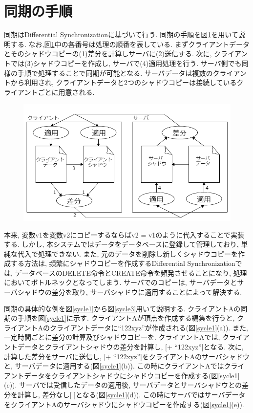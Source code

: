 \section{同期の手順}
同期はDifferential Synchronizationに基づいて行う.
同期の手順を図\ref{differential}を用いて説明する. なお,図\ref{differential}中の各番号は処理の順番を表している. まずクライアントデータとそのシャドウコピーの(1)差分を計算しサーバに(2)送信する. 次に, クライアントでは(3)シャドウコピーを作成し, サーバで(4)適用処理を行う. サーバ側でも同様の手順で処理することで同期が可能となる. サーバデータは複数のクライアントから利用され, クライアントデータと2つのシャドウコピーは接続しているクライアントごとに用意される.
\begin{figure}[]
  \begin{center}
    \includegraphics[scale=0.7]{images/DS}
    \caption{}
    \label{differential}
  \end{center}
\end{figure}
\par
本来, 変数v1を変数v2にコピーするならばv2 = v1のように代入することで実装する. しかし, 本システムではデータをデータベースに登録して管理しており, 単純な代入で処理できない.
また, 元のデータを削除し新しくシャドウコピーを作成する方法は, 頻繁にシャドウコピーを作成するDifferential Synchronizationでは,
データベースのDELETE命令とCREATE命令を頻発させることになり, 処理においてボトルネックとなってしまう. サーバでのコピーは, サーバデータとサーバシャドウの差分を取り, サーバシャドウに適用することによって解決する.
\par
同期の具体的な例を図\ref{sycle1}から図\ref{sycle3}用いて説明する. クライアントAの同期の手順を図\ref{sycle1}に示す.
クライアントAが頂点を作成する編集を行うと, クライアントAのクライアントデータに``122xyz''が作成される(図\ref{sycle1}(a)).
また, 一定時間ごとに差分の計算及びシャドウコピーを. クライアントAでは, クライアントデータとクライアントシャドウの差分を計算し, [+ ``122xyz'']となる. 次に, 計算した差分をサーバに送信し, [+ ``122xyz'']をクライアントAのサーバシャドウと, サーバデータに適用する(図\ref{sycle1}(b)). この時にクライアントAではクライアントデータをクライアントシャドウにシャドウコピーを作成する(図\ref{sycle1}(c)). サーバでは受信したデータの適用後, サーバデータとサーバシャドウとの差分を計算し, 差分なし[ ]となる(図\ref{sycle1}(d)). この時にサーバではサーバデータをクライアントAのサーバシャドウにシャドウコピーを作成する(図\ref{sycle1}(e)).
